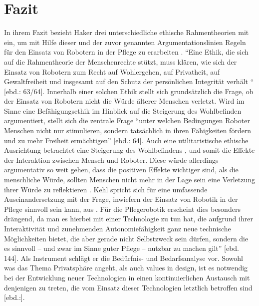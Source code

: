 \chapter{Fazit}
\label{ch:fazit}

In ihrem Fazit bezieht Haker drei unterschiedliche ethische Rahmentheorien mit ein, um mit Hilfe dieser und der zuvor genannten Argumentationslinien Regeln für den Einsatz von Robotern in der Pflege zu erarbeiten \cite{haker}. “Eine Ethik, die sich auf die Rahmentheorie der Menschenrechte stützt, muss klären, wie sich der Einsatz von Robotern zum Recht auf Wohlergehen, auf Privatheit, auf Gewaltfreiheit und insgesamt auf den Schutz der persönlichen Integrität verhält “ [ebd.: 63/64]. Innerhalb einer solchen Ethik stellt sich grundsätzlich die Frage, ob der Einsatz von Robotern nicht die Würde älterer Menschen verletzt. Wird im Sinne eine Befähigungsethik im Hinblick auf die Steigerung des Wohlbefinden argumentiert, stellt sich die zentrale Frage “unter welchen Bedingungen Roboter Menschen nicht nur stimulieren, sondern tatsächlich in ihren Fähigkeiten fördern und zu mehr Freiheit ermächtigen” [ebd.: 64]. Auch eine utilitaristische ethische Ausrichtung betrachtet eine Steigerung des Wohlbefindens \cite[8]{mill}, und somit die Effekte der Interaktion zwischen Mensch und Roboter. Diese würde allerdings argumentativ so weit gehen, dass die positiven Effekte wichtiger sind, als die menschliche Würde, sollten Menschen nicht mehr in der Lage sein eine Verletzung ihrer Würde zu reflektieren \cite[64]{haker}. Kehl spricht sich für eine umfassende Auseinandersetzung mit der Frage, inwiefern der Einsatz von Robotik in der Pflege sinnvoll sein kann, aus \cite[143 ff]{kehl}. \“Für  die  Pflegerobotik  erscheint  dies  besonders  drängend, da man es hierbei mit einer Technologie zu tun hat, die aufgrund ihrer Interaktivität  und  zunehmenden  Autonomiefähigkeit  ganz  neue  technische  Möglichkeiten  bietet,  die  aber  gerade  nicht  Selbstzweck  sein  dürfen,  sondern  die  es  sinnvoll  –  und  zwar  im  Sinne  guter  Pflege  –  nutzbar  zu  machen  gilt” [ebd. 144]. Als Instrument schlägt er die Bedürfnis- und Bedarfsanalyse vor. Sowohl was das Thema Privatsphäre angeht, als auch values in design, ist es notwendig bei der Entwicklung neuer Technologien in einen kontinuierlichen Austausch mit denjenigen zu treten, die vom Einsatz dieser Technologien letztlich betroffen sind [ebd.:].%
